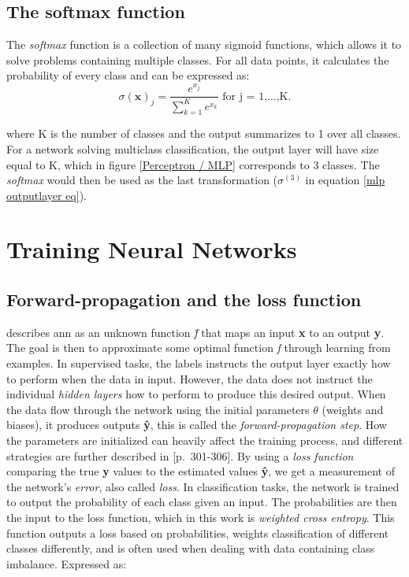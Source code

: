             
    \subsection{The softmax function}
        The \textit{softmax} function is a collection of many sigmoid functions, which allows it to solve problems containing multiple classes\cite{sharma2019new_activation_func}. For all data points, it calculates the probability of every class and can be expressed as:
        \begin{equation}
            \sigma(\textbf{x})_{j} = \dfrac{e^{x_{j}}}{\sum^{K}_{k=1}e^{x_{k}}} \textrm{ for j = 1,...,K.}
        \end{equation}
        
        where K is the number of classes and the output summarizes to 1 over all classes. For a network solving multiclass classification, the output layer will have size equal to K, which in figure \ref{Perceptron / MLP} corresponds to 3 classes. The \textit{softmax} would then be used as the last transformation ($\sigma^{(3)}$ in equation \ref{mlp outputlayer eq}).

\section{Training Neural Networks} \label{training neural networks}

\subsection{Forward-propagation and the loss function}
    \citeauthor{Goodfellow-et-al-2016_NN}\cite{Goodfellow-et-al-2016_NN} describes \gls{ann} as an unknown function \textit{\^{f}} that maps an input \textbf{x} to an output \textbf{y}. The goal is then to approximate some optimal function \textit{f} through learning from examples. In supervised tasks, the labels instructs the output layer exactly how to perform when the data in input. However, the data does not instruct the individual \textit{hidden layers} how to perform to produce this desired output. When the data flow through the network using the initial parameters $\theta$ (weights and biases), it produces outputs \textbf{\^{y}}, this is called the \textit{forward-propagation step}. How the parameters are initialized can heavily affect the training process, and different strategies are further described in \citeauthor{Goodfellow-et-al-2016}\cite{Goodfellow-et-al-2016}[p.~301-306]. By using a \textit{loss function} comparing the true \textbf{y} values to the estimated values \textbf{\^{y}}, we get a measurement of the network's \textit{error}, also called \textit{loss}. In classification tasks, the network is trained to output the probability of each class given an input\cite{ho2019real_weighted_cross_entropy}. The probabilities are then the input to the loss function, which in this work is \textit{weighted cross entropy}. This function outputs a loss based on probabilities, weights classification of different classes differently, and is often used when dealing with data containing class imbalance. Expressed as:
    
